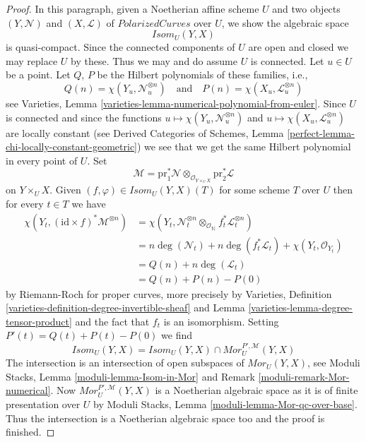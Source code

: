 \documentclass{stacks-project}
\theoremstyle{plain}
\theoremstyle{definition}
\theoremstyle{remark}
\numberwithin{equation}{subsection}
\begin{document}
\begin{proof}
\medskip\noindent
In this paragraph, given a Noetherian affine scheme $U$ and two objects
$(Y, \mathcal{N})$ and $(X, \mathcal{L})$
of $\textit{PolarizedCurves}$ over $U$, we show the algebraic space
$$
\mathit{Isom}_U(Y, X)
$$
is quasi-compact. Since the connected components of $U$ are open and closed
we may replace $U$ by these. Thus we may and do assume $U$ is connected.
Let $u \in U$ be a point. Let $Q$, $P$ be the Hilbert polynomials
of these families, i.e.,
$$
Q(n) = \chi(Y_u, \mathcal{N}_u^{\otimes n})
\quad\text{and}\quad
P(n) = \chi(X_u, \mathcal{L}_u^{\otimes n})
$$
see Varieties, Lemma \ref{varieties-lemma-numerical-polynomial-from-euler}.
Since $U$ is connected and since
the functions
$u \mapsto \chi(Y_u, \mathcal{N}_u^{\otimes n})$ and
$u \mapsto \chi(X_u, \mathcal{L}_u^{\otimes n})$
are locally constant (see 
Derived Categories of Schemes, Lemma
\ref{perfect-lemma-chi-locally-constant-geometric})
we see that we get the same Hilbert polynomial in every point of $U$.
Set
$$
\mathcal{M} = \text{pr}_1^*\mathcal{N}
\otimes_{\mathcal{O}_{Y \times_U X}} \text{pr}_2^*\mathcal{L}
$$
on $Y \times_U X$. Given $(f, \varphi) \in \mathit{Isom}_U(Y, X)(T)$
for some scheme $T$ over $U$ then for every $t \in T$ we have
\begin{align*}
\chi(Y_t, (\text{id} \times f)^*\mathcal{M}^{\otimes n})
& =
\chi(Y_t,
\mathcal{N}_t^{\otimes n} \otimes_{\mathcal{O}_{Y_t}}
f_t^*\mathcal{L}_t^{\otimes n}) \\
& =
n\deg(\mathcal{N}_t) + n\deg(f_t^*\mathcal{L}_t) +
\chi(Y_t, \mathcal{O}_{Y_t}) \\
& =
Q(n) + n\deg(\mathcal{L}_t) \\
& =
Q(n) + P(n) - P(0)
\end{align*}
by Riemann-Roch for proper curves, more precisely by
Varieties, Definition \ref{varieties-definition-degree-invertible-sheaf} and
Lemma \ref{varieties-lemma-degree-tensor-product}
and the fact that $f_t$ is an isomorphism.
Setting $P'(t) = Q(t) + P(t) - P(0)$ we find
$$
\mathit{Isom}_U(Y, X) =
\mathit{Isom}_U(Y, X) \cap \mathit{Mor}^{P', \mathcal{M}}_U(Y, X)
$$
The intersection is an intersection of open subspaces of
$\mathit{Mor}_U(Y, X)$, see
Moduli Stacks, Lemma \ref{moduli-lemma-Isom-in-Mor} and
Remark \ref{moduli-remark-Mor-numerical}.
Now $\mathit{Mor}^{P', \mathcal{M}}_U(Y, X)$
is a Noetherian algebraic space as it is of finite
presentation over $U$ by
Moduli Stacks, Lemma \ref{moduli-lemma-Mor-qc-over-base}.
Thus the intersection is a Noetherian algebraic space too
and the proof is finished.
\end{proof}
\end{document}
